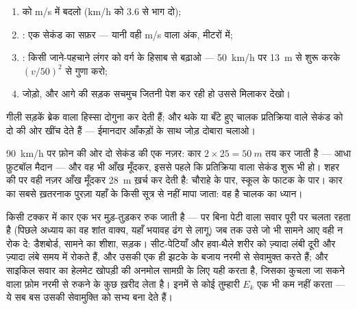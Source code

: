 \begin{method}[रुकने की दूरी का अंदाज़ा लगाना]\label{met:g9:kinetic-energy-safety:estimate}
\begin{enumerate}
  \item {} को \unit{m/s} में बदलो (\unit{km/h} को $3.6$ से भाग दो);
  \item {}: एक सेकंड का सफ़र --- यानी वही \unit{m/s}
        वाला अंक, मीटरों में;
  \item {}: किसी जाने-पहचाने लंगर को वर्ग के हिसाब से बढ़ाओ
        --- \qty{50}{km/h} पर \qty{13}{m} से शुरू करके $(v/50)^2$ से
        गुणा करो;
  \item जोड़ो, और आगे की सड़क सचमुच जितनी पेश कर रही हो उससे मिलाकर
        देखो।
\end{enumerate}
गीली सड़कें ब्रेक वाला हिस्सा दोगुना कर देती हैं; और थके या बँटे हुए
चालक प्रतिक्रिया वाले सेकंड को दो की ओर खींच देते हैं --- ईमानदार
आँकड़ों के साथ जोड़ दोबारा चलाओ।
\end{method}

\begin{example}[एक नज़र की क़ीमत]\label{ex:g9:kinetic-energy-safety:glance}
\qty{90}{km/h} पर फ़ोन की ओर दो सेकंड की एक नज़र: कार $2 \times 25 =
\qty{50}{m}$ तय कर जाती है --- आधा फ़ुटबॉल मैदान --- और वह भी
आँख मूँदकर, इससे पहले कि प्रतिक्रिया वाला सेकंड शुरू भी हो। शहर की 
पर वही नज़र आँख मूँदकर \qty{28}{m} ख़र्च कर देती है: चौराहे के पार,
स्कूल के फाटक के पार। कार का सबसे ख़तरनाक पुरज़ा यहाँ के किसी सूत्र से
नहीं मापा जाता: वह है चालक का ध्यान।
\end{example}

\begin{remark}[पेटियाँ, हवा-थैले और हेलमेट]\label{rem:g9:kinetic-energy-safety:belts}
किसी टक्कर में कार एक  भर मुड़-तुड़कर रुक जाती है --- पर बिना पेटी
वाला सवार पूरी  पर चलता रहता है (पिछले अध्याय का वह शांत वाक्य, यहाँ
भयावह ढंग से लागू) जब तक उसे जो भी सामने आए वही न रोक दे: डैशबोर्ड,
सामने का शीशा, सड़क। सीट-पेटियाँ और हवा-थैले शरीर को ज़्यादा लंबी दूरी
और ज़्यादा लंबे समय में रोकते हैं, और उसकी  एक ही झटके के
बजाय नरमी से सेवामुक्त करते हैं; और साइकिल सवार का हेलमेट खोपड़ी की
अनमोल सामग्री के लिए यही करता है, जिसका कुचला जा सकने वाला फ़ोम नरमी से
रुकने के कुछ  ख़रीद लेता है। इनमें से कोई तुम्हारी $E_k$ एक
 भी कम नहीं करता --- ये सब बस उसकी सेवामुक्ति को सभ्य बना देते हैं।
\end{remark}

